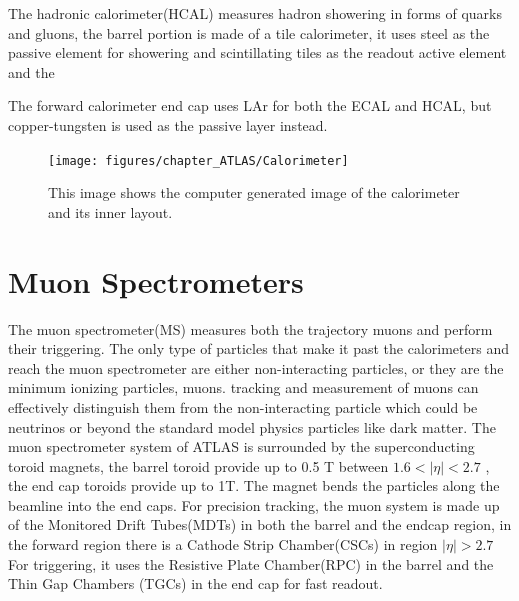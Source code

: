The hadronic calorimeter(HCAL) measures hadron showering in forms of quarks and gluons, the barrel portion is made of a tile calorimeter, it uses steel as the passive element for showering and scintillating tiles as the readout active element and the 

The forward calorimeter end cap uses LAr for both the ECAL and HCAL, but copper-tungsten is used as the passive layer instead. 


\begin{figure}[!htb]
    \begin{center}
        \texttt{[image: figures/chapter\_ATLAS/Calorimeter]}
        \caption{
		    This image shows the computer generated image of the calorimeter and its inner layout. \cite{Pequenao:1095927}
        }
        \label{fig:Calorimeter}
    \end{center}
\end{figure}

\section{Muon Spectrometers}
The muon spectrometer(MS) measures both the trajectory muons and perform their triggering. The only type of particles that make it past the calorimeters and reach the muon spectrometer are either non-interacting particles, or they are the minimum ionizing particles, muons. tracking and measurement of muons can effectively distinguish them from the non-interacting particle which could be neutrinos or beyond the standard model physics particles like dark matter. 
The muon spectrometer system of ATLAS is surrounded by the superconducting toroid magnets, the barrel toroid provide up to 0.5 T between $1.6 < |\eta|<2.7$ , the end cap toroids provide up to 1T. The magnet bends the particles along the beamline into the end caps.
For precision tracking, the muon system is made up of the Monitored Drift Tubes(MDTs) in both the barrel and the endcap region, in the forward region there is a Cathode Strip Chamber(CSCs) in region $|\eta|>2.7$
For triggering, it uses the Resistive Plate Chamber(RPC) in the barrel and the Thin Gap Chambers (TGCs) in the end cap for fast readout. 


